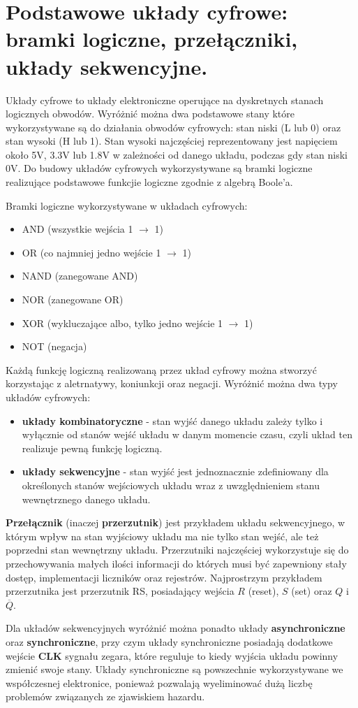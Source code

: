 \documentclass[../main.tex]{subfiles}
\begin{document}
\section{Podstawowe układy cyfrowe: bramki logiczne, przełączniki, układy sekwencyjne.}

Układy cyfrowe to układy elektroniczne operujące na dyskretnych stanach logicznych obwodów. Wyróżnić można dwa podstawowe stany które wykorzystywane są do działania obwodów cyfrowych: stan niski (L lub 0) oraz stan wysoki (H lub 1). Stan wysoki najczęściej reprezentowany jest napięciem około 5V, 3.3V lub 1.8V w zależności od danego układu, podczas gdy stan niski 0V. Do budowy układów cyfrowych wykorzystywane są bramki logiczne realizujące podstawowe funkcjie logiczne zgodnie z algebrą Boole'a.

Bramki logiczne wykorzystywane w układach cyfrowych:

\begin{itemize}
    \item AND (wszystkie wejścia 1 $\rightarrow$ 1)
    \item OR (co najmniej jedno wejście 1 $\rightarrow$ 1)
    \item NAND (zanegowane AND)
    \item NOR (zanegowane OR)
    \item XOR (wykluczające albo, tylko jedno wejście 1 $\rightarrow$ 1)
    \item NOT (negacja)
\end{itemize}

Każdą funkcję logiczną realizowaną przez układ cyfrowy można stworzyć korzystając z aletrnatywy, koniunkcji oraz negacji.
Wyróżnić można dwa typy układów cyfrowych:
\begin{itemize}
    \item \textbf{układy kombinatoryczne} - stan wyjść danego układu zależy tylko i wyłącznie od stanów wejść układu w danym momencie czasu, czyli układ ten realizuje pewną funkcję logiczną.
    \item \textbf{układy sekwencyjne} - stan wyjść jest jednoznacznie zdefiniowany dla określonych stanów wejściowych układu wraz z uwzględnieniem stanu wewnętrznego danego układu.
\end{itemize}
\textbf{Przełącznik} (inaczej \textbf{przerzutnik}) jest przykładem układu sekwencyjnego, w którym wpływ na stan wyjściowy układu ma nie tylko stan wejść, ale też poprzedni stan wewnętrzny układu. Przerzutniki najczęściej wykorzystuje się do przechowywania małych ilości informacji do których musi być zapewniony stały dostęp, implementacji liczników oraz rejestrów. Najprostrzym przykładem przerzutnika jest przerzutnik RS, posiadający wejścia $R$ (reset), $S$ (set) oraz $Q$ i $\overline{Q}$.

Dla układów sekwencyjnych wyróżnić można ponadto układy \textbf{asynchroniczne} oraz \textbf{synchroniczne}, przy czym układy synchroniczne posiadają dodatkowe wejście \textbf{CLK} sygnału zegara, które reguluje to kiedy wyjścia układu powinny zmienić swoje stany. Układy synchroniczne są powszechnie wykorzystywane we współczesnej elektronice, ponieważ pozwalają wyeliminować dużą liczbę problemów związanych ze zjawiskiem hazardu.
\end{document}
